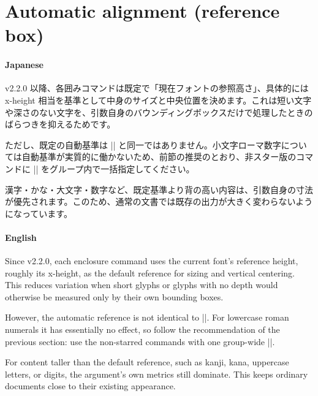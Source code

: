 \documentclass[luatex,fontsize=8pt,paper=b5,twoside]{jlreq}%
\begin{document}
\section{Automatic alignment (reference box)}
\paragraph{Japanese}
v2.2.0 以降、各囲みコマンドは既定で「現在フォントの参照高さ」、具体的には x-height 相当を基準として中身のサイズと中央位置を決めます。これは短い文字や深さのない文字を、引数自身のバウンディングボックスだけで処理したときのばらつきを抑えるためです。

ただし、既定の自動基準は \KKverb|| と同一ではありません。小文字ローマ数字については自動基準が実質的に働かないため、前節の推奨のとおり、非スター版のコマンドに \KKverb|| をグループ内で一括指定してください。

漢字・かな・大文字・数字など、既定基準より背の高い内容は、引数自身の寸法が優先されます。このため、通常の文書では既存の出力が大きく変わらないようになっています。

\paragraph{English}
Since v2.2.0, each enclosure command uses the current font's reference height, roughly its x-height, as the default reference for sizing and vertical centering. This reduces variation when short glyphs or glyphs with no depth would otherwise be measured only by their own bounding boxes.

However, the automatic reference is not identical to \KKverb||. For lowercase roman numerals it has essentially no effect, so follow the recommendation of the previous section: use the non-starred commands with one group-wide \KKverb||.

For content taller than the default reference, such as kanji, kana, uppercase letters, or digits, the argument's own metrics still dominate. This keeps ordinary documents close to their existing appearance.
\end{document}
